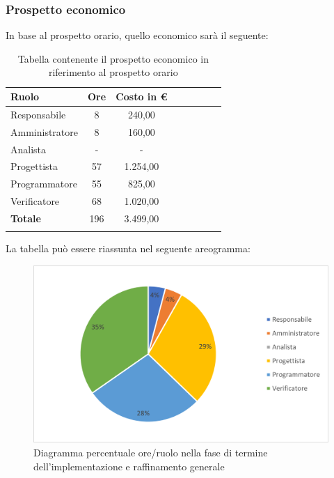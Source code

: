 			\subsubsection{Prospetto economico}
			In base al prospetto orario, quello economico sarà il seguente: 
			
			\begin{longtable}{|l|c|c|c|c|c|c|c|}
				\hline
				\rowcolor{lighter-grayer}
				\textbf{Ruolo} & \textbf{Ore} & \textbf{Costo in €} \\
				\hline
				\endfirsthead
				
				\hline
				Responsabile & 8 & 240,00\\
				\hline
				\hline
				Amministratore & 8 & 160,00\\
				\hline
				\hline
				Analista & - & -\\
				\hline
				\hline
				Progettista & 57 & 1.254,00\\
				\hline
				\hline
				Programmatore & 55 & 825,00\\
				\hline
				\hline
				Verificatore & 68 & 1.020,00\\
				\hline
				\hline
				\textbf{Totale} & 196 & 3.499,00\\
				\hline
				\rowcolor{white}
				\caption{Tabella contenente il prospetto economico in riferimento al prospetto orario}
			\end{longtable}
			\pagebreak
		
			La tabella può essere riassunta nel seguente areogramma:
			\begin{figure}[H]
				\centering
				\includegraphics[width=0.8\linewidth]{res/images/preventivo/6-2.png}
				\caption{Diagramma percentuale ore/ruolo nella fase di termine dell'implementazione e raffinamento generale}
				\label{fig:diagramma costi ruolo fase termine dell'implementazione e raffinamento generale}
            \end{figure}

